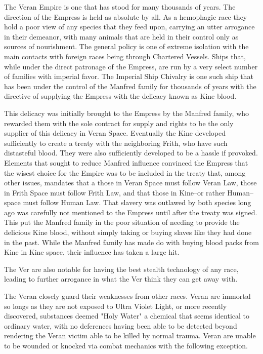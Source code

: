 \documentclass[blue]{guildcamp4}
\begin{document}
\name{\bVer{}}

The Veran Empire is one that has stood for many thousands of years. The direction of the Empress is held as absolute by all. As a hemophagic race they hold a poor view of any species that they feed upon, carrying an utter arrogance in their demeanor, with many animals that are held in their control only as sources of nourishment. The general policy is one of extreme isolation with the main contacts with foreign races being through Chartered Vessels. Ships that, while under the direct patronage of the Empress, are run by a very select number of families with imperial favor. The Imperial Ship Chivalry is one such ship that has been under the control of the Manfred family for thousands of years with the directive of supplying the Empress with the delicacy known as Kine blood. 

This delicacy was initially brought to the Empress by the Manfred family, who rewarded them with the sole contract for supply and rights to be the only supplier of this delicacy in Veran Space. Eventually the Kine developed sufficiently to create a treaty with the neighboring Frith, who have such distasteful blood. They were also sufficiently developed to be a hassle if provoked. Elements that sought to reduce Manfred influence convinced the Empress that the wisest choice for the Empire was to be included in the treaty that, among other issues, mandates that a those in Veran Space must follow Veran Law, those in Frith Space must follow Frith Law, and that those in Kine--or rather Human--space must follow Human Law. That slavery was outlawed by both species long ago was carefully not mentioned to the Empress until after the treaty was signed. This put the Manfred family in the poor situation of needing to provide the delicious Kine blood, without simply taking or buying slaves like they had done in the past. While the Manfred family has made do with buying blood packs from Kine in Kine space, their influence has taken a large hit.

The Ver are also notable for having the best stealth technology of any race, leading to further arrogance in what the Ver think they can get away with.

The Veran closely guard their weaknesses from other races. Veran are immortal so longs as they are not exposed to Ultra Violet Light, or more recently discovered, substances deemed "Holy Water" a chemical that seems identical to ordinary water, with no deferences having been able to be detected beyond rendering the Veran victim able to be killed by normal trauma. 
Veran are unable to be wounded or knocked via combat mechanics with the following exception.
\end{document}
